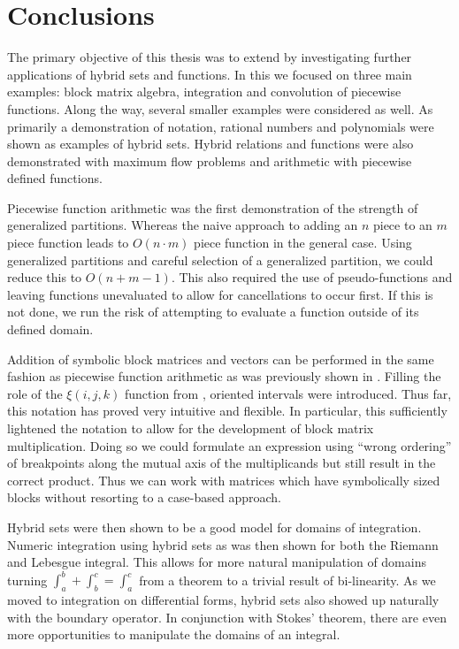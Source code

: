 \chapter{Conclusions}
\doublespacing

The primary objective of this thesis was to extend \cite{carette2010} by investigating further applications of hybrid sets and functions. 
In this we focused on three main examples: block matrix algebra, integration and convolution of piecewise functions. 
Along the way, several smaller examples were considered as well.
As primarily a demonstration of notation, rational numbers and polynomials were shown as examples of hybrid sets.
Hybrid relations and functions were also demonstrated with maximum flow problems and arithmetic with piecewise defined functions.


Piecewise function arithmetic was the first demonstration of the strength of generalized partitions.
Whereas the naive approach to adding an $n$ piece to an $m$ piece function leads to $O(n\cdot m)$ piece function in the 
general case.
Using generalized partitions and careful selection of a generalized partition, we could reduce this to $O(n+m-1)$.
This also required the use of pseudo-functions and leaving functions unevaluated to allow for cancellations to occur first.
If this is not done, we run the risk of attempting to evaluate a function outside of its defined domain.


Addition of symbolic block matrices and vectors can be performed in the same fashion as piecewise function arithmetic
as was previously shown in \cite{carette2010}.
Filling the role of the $\xi(i,j,k)$ function from \cite{sexton2008abstract}, oriented intervals were introduced.
Thus far, this notation has proved very intuitive and flexible.
In particular, this sufficiently lightened the notation to allow for the development of block matrix multiplication.
Doing so we could formulate an expression using ``wrong ordering'' of breakpoints along the mutual axis of the
multiplicands but still result in the correct product.
Thus we can work with matrices which have symbolically sized blocks without resorting to a case-based approach. 


Hybrid sets were then shown to be a good model for domains of integration.
Numeric integration using hybrid sets as was then shown for both the Riemann and Lebesgue integral.
This allows for more natural manipulation of domains turning $\int_a^b + \int_b^c = \int_a^c$ from a theorem to 
a trivial result of bi-linearity.
As we moved to integration on differential forms, hybrid sets also showed up naturally with the boundary operator.
In conjunction with Stokes' theorem, there are even more opportunities to manipulate  the domains of an integral.


